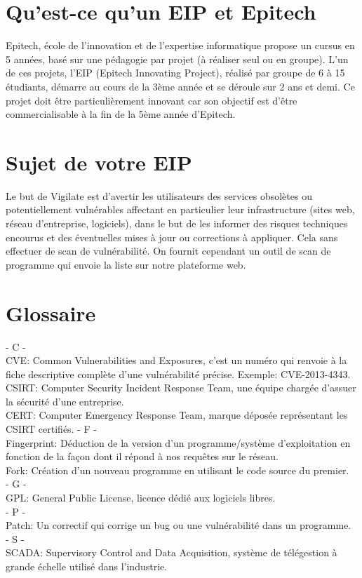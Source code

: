 \section{Qu'est-ce qu’un EIP et Epitech}
Epitech,  école de l'innovation et de l'expertise informatique propose un cursus en 5 années, basé sur une pédagogie par projet (à réaliser seul ou en groupe).  L'un de ces projets, l’EIP (Epitech Innovating Project), réalisé par groupe de 6 à 15 étudiants, démarre au cours de la 3ème année et se déroule sur 2 ans et demi. Ce  projet doit être particulièrement innovant car son objectif est d’être commercialisable à la fin de la 5ème année d’Epitech.

\section{Sujet de votre EIP}
Le but de Vigilate est d’avertir les utilisateurs des services obsolètes ou potentiellement vulnérables affectant en particulier leur infrastructure (sites web, réseau d'entreprise, logiciels), dans le but de les informer des risques techniques encourus et des éventuelles mises à jour ou corrections à appliquer.
Cela sans effectuer de scan de vulnérabilité.
On fournit cependant un outil de scan de programme qui envoie la liste sur notre plateforme web.

\section{Glossaire}
\noindent
- C -\\
CVE: Common Vulnerabilities and Exposures, c'est un numéro qui renvoie à la fiche descriptive complète d'une vulnérabilité précise. Exemple: CVE-2013-4343.\\
CSIRT: Computer Security Incident Response Team, une équipe chargée d'assuer la sécurité d'une entreprise.\\
CERT: Computer Emergency Response Team, marque déposée représentant les CSIRT certifiés.
- F -\\
Fingerprint: Déduction de la version d'un programme/système d'exploitation en fonction de la façon dont il répond à nos requêtes sur le réseau.\\
Fork: Création d'un nouveau programme en utilisant le code source du premier.\\
- G -\\
GPL: General Public License, licence dédié aux logiciels libres.\\
- P -\\
Patch: Un correctif qui corrige un bug ou une vulnérabilité dans un programme.\\
- S -\\
SCADA: Supervisory Control and Data Acquisition, système de télégestion à grande échelle utilisé dans l'industrie.\\

